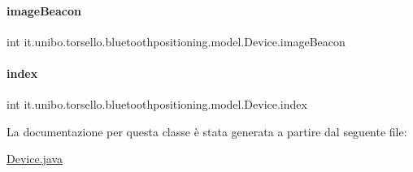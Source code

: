 \hypertarget{classit_1_1unibo_1_1torsello_1_1bluetoothpositioning_1_1model_1_1Device_a2faee0d51162a4efebfc2db787901019_a2faee0d51162a4efebfc2db787901019}{}\label{classit_1_1unibo_1_1torsello_1_1bluetoothpositioning_1_1model_1_1Device_a2faee0d51162a4efebfc2db787901019_a2faee0d51162a4efebfc2db787901019} 
\paragraph{\texorpdfstring{image\+Beacon}{imageBeacon}}
{\footnotesize\ttfamily int it.\+unibo.\+torsello.\+bluetoothpositioning.\+model.\+Device.\+image\+Beacon\hspace{0.3cm}{\ttfamily [private]}}

\hypertarget{classit_1_1unibo_1_1torsello_1_1bluetoothpositioning_1_1model_1_1Device_a55a01164b2388451f5e8344bfbc61ccc_a55a01164b2388451f5e8344bfbc61ccc}{}\label{classit_1_1unibo_1_1torsello_1_1bluetoothpositioning_1_1model_1_1Device_a55a01164b2388451f5e8344bfbc61ccc_a55a01164b2388451f5e8344bfbc61ccc} 
\paragraph{\texorpdfstring{index}{index}}
{\footnotesize\ttfamily int it.\+unibo.\+torsello.\+bluetoothpositioning.\+model.\+Device.\+index\hspace{0.3cm}{\ttfamily [private]}}



La documentazione per questa classe è stata generata a partire dal seguente file\+:\begin{DoxyCompactItemize}
\item 
\hyperlink{Device_8java}{Device.\+java}\end{DoxyCompactItemize}
